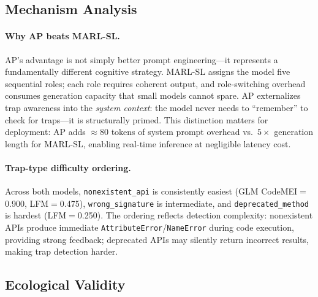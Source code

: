 \documentclass{article}
\begin{document}
\subsection{Mechanism Analysis}

\paragraph{Why AP beats MARL-SL.}
AP's advantage is not simply better prompt engineering---it represents a fundamentally different cognitive strategy.
MARL-SL assigns the model five sequential roles; each role requires coherent output, and role-switching overhead consumes generation capacity that small models cannot spare.
AP externalizes trap awareness into the \emph{system context}: the model never needs to ``remember'' to check for traps---it is structurally primed.
This distinction matters for deployment: AP adds ${\approx}$80 tokens of system prompt overhead vs.\ $5{\times}$ generation length for MARL-SL, enabling real-time inference at negligible latency cost.

\paragraph{Trap-type difficulty ordering.}
Across both models, \texttt{nonexistent\_api} is consistently easiest (GLM CodeMEI$=$0.900, LFM$=$0.475), \texttt{wrong\_signature} is intermediate, and \texttt{deprecated\_method} is hardest (LFM$=$0.250).
The ordering reflects detection complexity: nonexistent APIs produce immediate \texttt{AttributeError}/\texttt{NameError} during code execution, providing strong feedback; deprecated APIs may silently return incorrect results, making trap detection harder.

\subsection{Ecological Validity}
\end{document}
